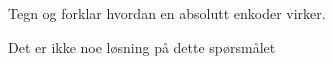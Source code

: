 

Tegn og forklar hvordan en absolutt enkoder virker. 








Det er ikke noe l{\o}sning p{\aa} dette sp{\o}rsm{\aa}let













